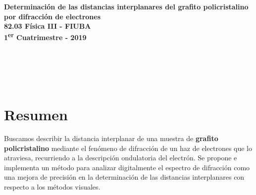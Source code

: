 \documentclass[a4paper, 10pt, spanish]{article}
\numberwithin{equation}{section}
\numberwithin{table}{section}
\begin{document}
\marginsize{2cm}{2cm}{2cm}{2cm}

%
%
\setcounter{page}{1}

%
%


%
%
\thispagestyle{empty}

\begin{center}
{\LARGE{\bfseries Determinación de las distancias interplanares del grafito policristalino por difracción de electrones}}\\
\vspace{0.3cm	}
{\LARGE{\bfseries 82.03 Física III - FIUBA}}\\
{\large{\bfseries 1\textsuperscript{er} Cuatrimestre - 2019}}
\end{center}

\hspace

\begin{center}
{\large{}}\\
{\large{}}\\
\end{center}

\begin{center}
{\large{}}\\
\end{center}





\section{Resumen}
Buscamos describir la distancia interplanar de una muestra de \textbf{grafito policristalino} mediante el fenómeno de difracción de un haz de electrones que lo atraviesa, recurriendo a la descripción ondulatoria del electrón. Se propone e implementa un método para analizar digitalmente el espectro de difracción como una mejora de precisión en la determinación de las distancias interplanares con respecto a los métodos visuales.
\end{document}
